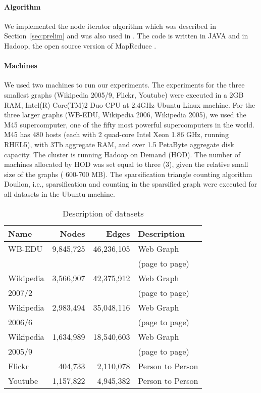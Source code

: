 \documentclass{llncs}
\begin{document}
\paragraph{Algorithm}
We implemented the node iterator algorithm which was described in Section~\ref{sec:prelim} and was also used in \cite{Tsourakakiskdd09}. 
The code is written in JAVA and in Hadoop, the open source version of MapReduce \cite{dean}.

\paragraph{Machines}
We used two machines to run our experiments. The experiments for the three smallest graphs (Wikipedia 2005/9, 
Flickr, Youtube) were executed in a  2GB RAM, Intel(R) Core(TM)2 Duo CPU at 2.4GHz Ubuntu Linux machine.
For the three larger graphs (WB-EDU, Wikipedia 2006, Wikipedia 2005), we used the M45 supercomputer,
one of the fifty most powerful supercomputers in the world.
M45 has 480 hosts (each with  2 quad-core Intel Xeon 1.86 GHz, running
RHEL5),
with 3Tb aggregate RAM, and over 1.5 PetaByte aggregate disk capacity.
The cluster is running Hadoop on Demand (HOD). The number of machines allocated by HOD was set equal to three (3), 
given the relative small size of the graphs ( 600-700 MB).
The sparsification triangle counting algorithm Doulion, i.e., sparsification and counting in the sparsified graph
were executed for all datasets in the Ubuntu machine. 
 
\begin{table}[ht]
\begin{center}
\begin{tabular}{|l|r|r|l|} \hline \hline
   Name  & Nodes & Edges &  Description  \\ \hline \hline
   WB-EDU&   9,845,725  &    46,236,105   &   Web Graph                    \\
                        &            &              & (page to page) \\ \hline
   Wikipedia  & 3,566,907 & 42,375,912  & Web Graph \\
   2007/2                    &            &              & (page to page) \\\hline
   Wikipedia & 2,983,494  & 35,048,116   & Web Graph  \\ 
    2006/6                    &            &              & (page to page) \\ \hline
   Wikipedia  & 1,634,989  & 18,540,603   & Web Graph   \\ 
    2005/9                   &            &              & (page to page) \\\hline
    Flickr & 404,733  & 2,110,078    & Person to Person \\ \hline
    Youtube &   1,157,822    &  4,945,382  & Person to Person\\ \hline
\end{tabular}
\end{center}
\caption{ Description of datasets }
\label{tab:datasets}
\end{table}
\end{document}
